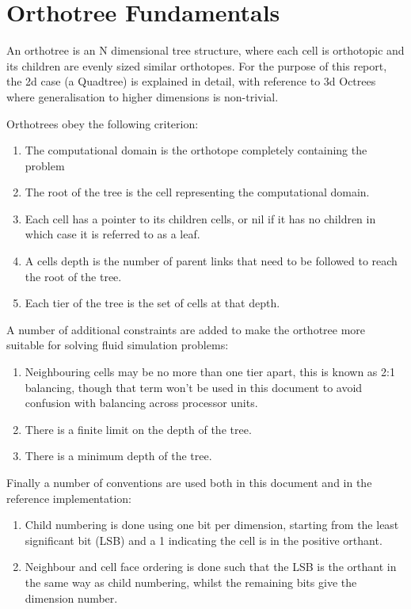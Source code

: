 \documentclass{IIBproject}
\begin{document}
\section{Orthotree Fundamentals}
\label{orthotree}
An orthotree is an N dimensional tree structure, where each cell is orthotopic \cite{coxeter73} and its children are evenly sized similar orthotopes. For the purpose of this report, the 2d case (a Quadtree) is explained in detail, with reference to 3d Octrees where generalisation to higher dimensions is non-trivial. 

Orthotrees obey the following criterion:
\begin{enumerate}
	\item The computational domain is the orthotope completely containing the problem
	\item The root of the tree is the cell representing the computational domain.
	\item Each cell has a pointer to its children cells, or nil if it has no children in which case it is referred to as a leaf.
	\item A cells depth is the number of parent links that need to be followed to reach the root of the tree.
	\item Each tier of the tree is the set of cells at that depth.
\end{enumerate}

A number of additional constraints are added to make the orthotree more suitable for solving fluid simulation problems:
\begin{enumerate}
	\item Neighbouring cells may be no more than one tier apart, this is known as 2:1 balancing, though that term won't be used in this document to avoid confusion with balancing across processor units.
	\item There is a finite limit on the depth of the tree.
	\item There is a minimum depth of the tree.
\end{enumerate}

Finally a number of conventions are used both in this document and in the reference implementation:
\begin{enumerate}
	\item Child numbering is done using one bit per dimension, starting from the least significant bit (LSB) and a 1 indicating the cell is in the positive orthant. 
	\item Neighbour and cell face ordering is done such that the LSB is the orthant in the same way as child numbering, whilst the remaining bits give the dimension number.
\end{enumerate}
\end{document}
